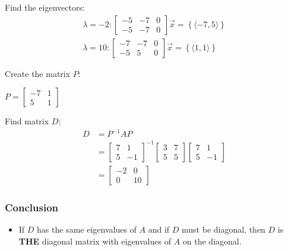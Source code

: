 \documentclass[
  letterpaper,
  DIV=11,
  numbers=noendperiod]{scrartcl}
\providecommand{\tightlist}{%
  \setlength{\itemsep}{0pt}\setlength{\parskip}{0pt}}\usepackage{longtable,booktabs,array}
\begin{document}
Find the eigenvectors: \begin{align*}
\lambda = -2: \left[\begin{array}{cc|c}-5 & -7 & 0 \\ -5 & -7 & 0\end{array}\right] 
\vec{x} = \left\{\langle-7, 5\rangle\right\} \\
\lambda = 10: \left[\begin{array}{cc|c}-7 & -7 & 0 \\ -5 & 5 & 0\end{array}\right]
\vec{x} = \left\{\langle1,     1\rangle\right\}
\end{align*}

\newpage{}

Create the matrix \(P\):

\(P = \begin{bmatrix}-7 & 1 \\ 5 & 1\end{bmatrix}\)

Find matrix \(D\): \begin{align*}
D &= P^{-1}AP \\
&= \begin{bmatrix}7 & 1 \\ 5 & -1\end{bmatrix}^{-1}\begin{bmatrix}3 & 7 \\ 5 & 5\end{bmatrix}\begin{bmatrix}7 & 1 \\ 5 & -1\end{bmatrix} \\
&= \begin{bmatrix}-2 & 0 \\ 0 & 10\end{bmatrix}
\end{align*}

\subsubsection{Conclusion}\label{conclusion}

\begin{itemize}
\tightlist
\item
  If \(D\) has the same eigenvalues of \(A\) and if \(D\) must be
  diagonal, then \(D\) is \textbf{THE} diagonal matrix with eigenvalues
  of \(A\) on the diagonal.
\end{itemize}
\end{document}
